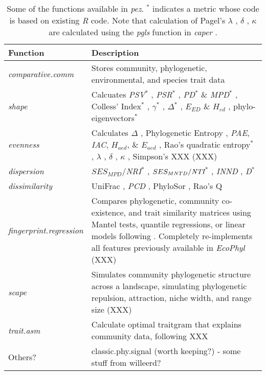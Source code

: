 \documentclass[11pt]{article} %
\begin{document}
\begin{table}
\begin{center}
\begin{tabular}{p{3.5cm} p{14cm}}
  Function & Description\\\hline
  \emph{comparative.comm} & Stores community, phylogenetic, environmental, and species trait data\\
  \emph{shape} & Calcuates \emph{PSV}$^*$ \autocite{Helmus2007}, \emph{PSR}$^*$ \autocite{Helmus2007}, \emph{PD}$^*$ \& \emph{MPD}$^*$ \autocite{Faith1992}, Colless' Index$^*$ \autocite{Colless1982}, $\gamma$$^*$ \autocite{Pybus2000}, $\Delta$$^*$ \autocite{Warwick1995}, $E_{ED}$ \& $H_{ed}$ \autocite{Cadotte2010}, phylo-eigenvectors$^*$ \autocite{Diniz-Filho2011}\\
  \emph{evenness} & Calculates $\Delta$ \autocite{Warwick1995}, Phylogenetic Entropy \autocite{Allen2009}, \emph{PAE}, \emph{IAC}, $H_{aed}$, \& $E_{aed}$ \autocite{Cadotte2010}, Rao's quadratic entropy$^*$ \autocite{Rao1982a}, $\lambda$ \autocite{Pagel1999}, $\delta$ \autocite{Pagel1999}, $\kappa$ \autocite{Pagel1999}, Simpson's XXX (XXX)\\
  \emph{dispersion} & $SES_{MPD}$/\emph{NRI}$^*$ \autocite{Webb2000,Webb2002,Kembel2009}, $SES_{MNTD}/\emph{NTI}$$^*$ \autocite{Webb2000,Webb2002,Kembel2009}, \emph{INND} \autocite{Ness2011}, \emph{D}$^*$ \autocite{Fritz2010}\\
\emph{dissimilarity} &  UniFrac \autocite{Lozupone2005}, \emph{PCD} \autocite{Helmus2010}, PhyloSor \autocite{Bryant2008}, Rao's Q \autocite{Rao1982a}\\
  \emph{fingerprint.regression} & Compares phylogenetic, community co-existence, and trait similarity matrices using Mantel tests, quantile regressions, or linear models following \autocite{Cavender-Bares2004,Cavender-Bares2006}. Completely re-implements all features previously available in \emph{EcoPhyl} (XXX) \\
  \emph{scape} & Simulates community phylogenetic structure across a landscape, simulating phylogenetic repulsion, attraction, niche width, and range size (XXX)\\
  \emph{trait.asm} & Calculate optimal traitgram that explains community data, following XXX\\
  Others? & classic.phy.signal (worth keeping?) - some stuff from willeerd?\\
  \hline
\end{tabular}
\caption{Some of the functions available in \emph{pez}. $^*$ indicates
  a metric whose code is based on existing \emph{R} code. Note that
  calculation of Pagel's $\lambda$ \autocite{Pagel1999}, $\delta$
  \autocite{Pagel1999}, $\kappa$ \autocite{Pagel1999} are calculated
  using the \emph{pgls} function in \emph{caper} \autocite{Orme2013}.}
\label{metricTable}
\end{center}
\end{table}
\end{document}
